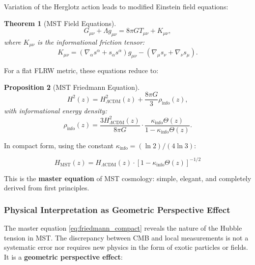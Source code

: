\documentclass[11pt, a4paper]{article}
\theoremstyle{plain}
\newtheorem{theorem}{Theorem}[section]
\newtheorem{proposition}[theorem]{Proposition}
\theoremstyle{definition}
\newcommand{\Kinfo}{\kappa_{\text{info}}}
\begin{document}
Variation of the Herglotz action leads to modified Einstein field equations:

\begin{theorem}[MST Field Equations]
\begin{equation}
G_{\mu\nu} + \Lambda g_{\mu\nu} = 8\pi G T_{\mu\nu} + K_{\mu\nu},
\label{eq:field_equations}
\end{equation}
where $K_{\mu\nu}$ is the informational friction tensor:
\begin{equation}
K_{\mu\nu} = (\nabla_\alpha s^\alpha + s_\alpha s^\alpha) g_{\mu\nu} - (\nabla_\mu s_\nu + \nabla_\nu s_\mu).
\end{equation}
\end{theorem}

For a flat FLRW metric, these equations reduce to:

\begin{proposition}[MST Friedmann Equation]
\begin{equation}
H^2(z) = H^2_{\Lambda\text{CDM}}(z) + \frac{8\pi G}{3} \rho_{\text{info}}(z),
\label{eq:friedmann_mst_full}
\end{equation}
with informational energy density:
\begin{equation}
\rho_{\text{info}}(z) = \frac{3H^2_{\Lambda\text{CDM}}(z)}{8\pi G} \cdot \frac{\Kinfo \Theta(z)}{1 - \Kinfo \Theta(z)}.
\end{equation}
\end{proposition}

In compact form, using the constant $\Kinfo = (\ln 2)/(4\ln 3)$:

\begin{equation}
\boxed{H_{\text{MST}}(z) = H_{\Lambda\text{CDM}}(z) \cdot \left[1 - \Kinfo \Theta(z)\right]^{-1/2}}
\label{eq:friedmann_compact}
\end{equation}

This is the \textbf{master equation} of MST cosmology: simple, elegant, and completely derived from first principles.

\subsubsection{Physical Interpretation as Geometric Perspective Effect}
\label{subsec:perspective_effect}

The master equation \eqref{eq:friedmann_compact} reveals the nature of the Hubble tension in MST. The discrepancy between CMB and local measurements is not a systematic error nor requires new physics in the form of exotic particles or fields. It is a \textbf{geometric perspective effect}:
\end{document}
